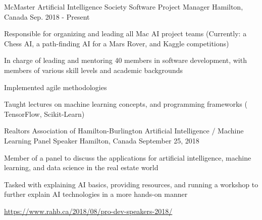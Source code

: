 



\begin{cventries}
\vspace{-1mm}
\cventry
  {McMaster Artificial Intelligence Society}
  {Software Project Manager}
  {Hamilton, Canada}
  {Sep. 2018 - Present}
  {
    \begin{cvitems}
      \item {Responsible for organizing and leading all Mac AI project teams (Currently: a Chess AI, a path-finding AI for a Mars Rover, and Kaggle competitions)}
      \item { In charge of leading and mentoring 40 members in software development, with 
members of various skill levels and academic backgrounds}
      \item {Implemented agile methodologies}
      \item {Taught lectures on machine learning concepts, and programming frameworks ( TensorFlow, Scikit-Learn)}
    \end{cvitems} 
  }

\vspace{-2mm}
\cventry
    {Realtors Association of Hamilton-Burlington} %
    {Artificial Intelligence / Machine Learning Panel Speaker} %
    {Hamilton, Canada} %
    {September 25, 2018} %
    {
      \begin{cvitems} %
        \item {Member of a panel to discuss the applications for artificial intelligence, machine learning, and data science in the real estate world}
        \item {Tasked with explaining AI basics, providing resources, and running a workshop to further explain AI technologies in a more hands-on manner}
        \item {\url{https://www.rahb.ca/2018/08/pro-dev-speakers-2018/}}
      \end{cvitems}
    }
\end{cventries}
